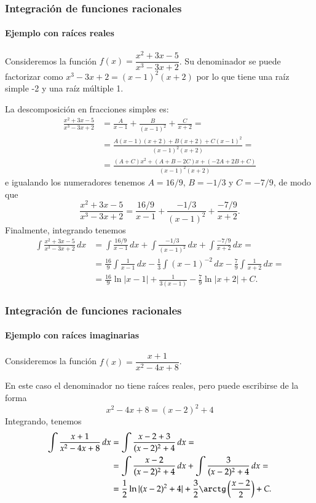 \begin{frame}[allowframebreaks]
\frametitle{Integración de funciones racionales}
\framesubtitle{Ejemplo con raíces reales}
Consideremos la función $f(x)=\dfrac{x^2+3x-5}{x^3-3x+2}$. Su denominador se puede factorizar como $x^3-3x+2=(x-1)^2(x+2)$ por lo que tiene una raíz simple -2 y una raíz múltiple 1.

La descomposición en fracciones simples es:
\begin{align*}
\frac{x^2+3x-5}{x^3-3x+2}&=\frac{A}{x-1}+\frac{B}{(x-1)^2}+\frac{C}{x+2} = \\ &= \frac{A(x-1)(x+2)+ B(x+2)+C(x-1)^2}{(x-1)^2(x+2)} = \\ &= \frac{(A+C)x^2+(A+B-2C)x+(-2A+2B+C)}{(x-1)^2(x+2)}
\end{align*}
e igualando los numeradores tenemos $A=16/9$, $B=-1/3$ y $C=-7/9$, de modo que
\[
\frac{x^2+3x-5}{x^3-3x+2}= \frac{16/9}{x-1}+\frac{-1/3}{(x-1)^2}+\frac{-7/9}{x+2}.
\]
Finalmente, integrando tenemos
\begin{align*}
\int \frac{x^2+3x-5}{x^3-3x+2}\, dx &= \int \frac{16/9}{x-1}\,dx+\int \frac{-1/3}{(x-1)^2}\,dx+\int \frac{-7/9}{x+2}\,dx = \\ &=
\frac{16}{9}\int\frac{1}{x-1}\,dx-\frac{1}{3}\int(x-1)^{-2}\,dx- \frac{7}{9}\int \frac{1}{x+2}\,dx = \\
&= \frac{16}{9}\ln|x-1|+\frac{1}{3(x-1)}-\frac{7}{9}\ln|x+2|+C.
\end{align*}
\end{frame}


\begin{frame}
\frametitle{Integración de funciones racionales}
\framesubtitle{Ejemplo con raíces imaginarias}
Consideremos la función $f(x)=\dfrac{x+1}{x^2-4x+8}$. 

En este caso el denominador no tiene raíces reales, pero puede escribirse de la forma
\[
x^2-4x+8 = (x-2)^2+4
\]
Integrando, tenemos
\begin{align*}
\int \dfrac{x+1}{x^2-4x+8}\, dx &= \int \dfrac{x-2+3}{(x-2)^2+4}\,dx = \\
&= \int \dfrac{x-2}{(x-2)^2+4}\,dx + \int \dfrac{3}{(x-2)^2+4}\,dx = \\
&= \frac{1}{2}\ln|(x-2)^2+4| + \dfrac{3}{2}\arctg\left(\frac{x-2}{2}\right)+C.
\end{align*}
\end{frame}


